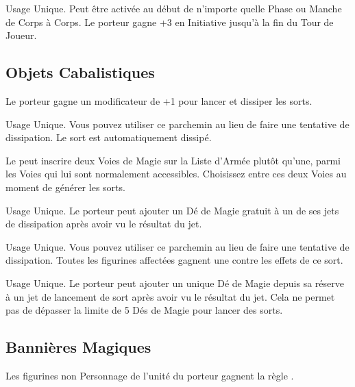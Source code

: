 Usage Unique. Peut être activée au début de n'importe quelle Phase ou Manche de Corps à Corps. Le porteur gagne +3 en Initiative jusqu'à la fin du Tour de Joueur.

\endpricelist

\newpage
\hypertarget{arcaneitems}{\subsection{Objets Cabalistiques}}
\label{arcane_items}

\startpricelist

Le porteur gagne un modificateur de +1 pour lancer et dissiper les sorts.

Usage Unique. Vous pouvez utiliser ce parchemin au lieu de faire une tentative de dissipation. Le sort est automatiquement dissipé.

Le \wizard{} peut inscrire deux Voies de Magie sur la Liste d'Armée plutôt qu'une, parmi les Voies qui lui sont normalement accessibles. Choisissez entre ces deux Voies au moment de générer les sorts.

Usage Unique. Le porteur peut ajouter un Dé de Magie gratuit à un de ses jets de dissipation après avoir vu le résultat du jet.

\columnbreak

Usage Unique. Vous pouvez utiliser ce parchemin au lieu de faire une tentative de dissipation. Toutes les figurines affectées gagnent une  contre les effets de ce sort.

Usage Unique. Le porteur peut ajouter un unique Dé de Magie depuis sa réserve à un jet de lancement de sort après avoir vu le résultat du jet. Cela ne permet pas de dépasser la limite de 5 Dés de Magie pour lancer des sorts.

\endpricelist

\newpage
\hypertarget{magicalstandards}{\subsection{Bannières Magiques}}
\label{magical_standards}

\startpricelist

Les figurines non Personnage de l'unité du porteur gagnent la règle .

